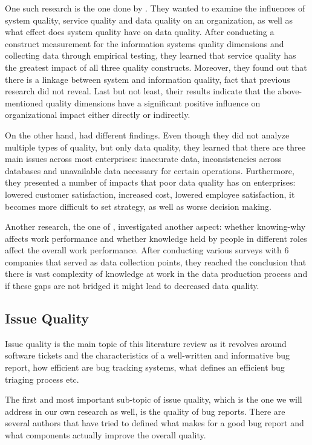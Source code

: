 \documentclass{mprop}
\begin{document}
One such research is the one done by \citet{gorla2010organizational}. They wanted
to examine the influences of system quality, service quality and data quality
on an organization, as well as what effect does system quality have on
data quality. After conducting a construct measurement for the information
systems quality dimensions \citep{swanson1997maintaining} and collecting data
through empirical testing, they learned that service quality has the greatest
impact of all three quality constructs. Moreover, they found out that there is 
a linkage between system and information quality, fact that previous research
did not reveal. Last but not least, their results indicate that the 
above-mentioned quality dimensions have a significant positive influence on 
organizational impact either directly or indirectly. 

On the other hand, \citet{redman1998impact} had different findings. Even though
they did not analyze multiple types of quality, but only data quality, they 
learned that there are three main issues across most enterprises: inaccurate
data, inconsistencies across databases and unavailable data necessary for 
certain operations. Furthermore, they presented a number of impacts that
poor data quality has on enterprises: lowered customer satisfaction, increased
cost, lowered employee satisfaction, it becomes more difficult to set strategy,
as well as worse decision making.

Another research, the one of \citet{lee2003knowing}, investigated another 
aspect: whether knowing-why affects work performance and whether knowledge held
by people in different roles affect the overall work performance. After
conducting various surveys with 6 companies that served as data collection 
points, they reached the conclusion that there is vast complexity of 
knowledge at work in the data production process and if these gaps are not 
bridged it might lead to decreased data quality.

\subsection{Issue Quality}\label{issue_quality}

Issue quality is the main topic of this literature review as it revolves around
software tickets and the characteristics of a well-written and 
informative bug report, how efficient are bug tracking systems, what defines
an efficient bug triaging process etc. 

The first and most important sub-topic of issue quality, which is the one
we will address in our own research as well, is the quality of bug reports.
There are several authors that have tried to defined what makes for a good bug
report and what components actually improve the overall quality.
\end{document}
